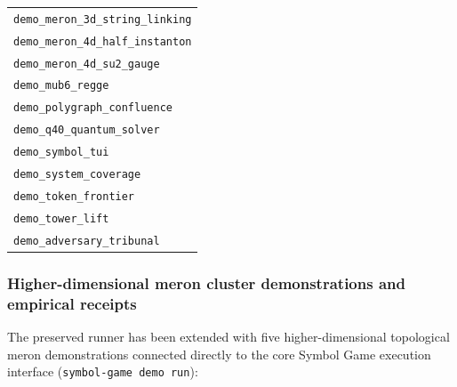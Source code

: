 \documentclass[
  11pt,
]{article}
\begin{document}
\begin{longtable}[]{@{}l@{}}
\texttt{demo\_\allowbreak{}meron\_\allowbreak{}3d\_\allowbreak{}string\_\allowbreak{}linking} \\
\texttt{demo\_\allowbreak{}meron\_\allowbreak{}4d\_\allowbreak{}half\_\allowbreak{}instanton} \\
\texttt{demo\_\allowbreak{}meron\_\allowbreak{}4d\_\allowbreak{}su2\_\allowbreak{}gauge} \\
\texttt{demo\_\allowbreak{}mub6\_\allowbreak{}regge} \\
\texttt{demo\_\allowbreak{}polygraph\_\allowbreak{}confluence} \\
\texttt{demo\_\allowbreak{}q40\_\allowbreak{}quantum\_\allowbreak{}solver} \\
\texttt{demo\_\allowbreak{}symbol\_\allowbreak{}tui} \\
\texttt{demo\_\allowbreak{}system\_\allowbreak{}coverage} \\
\texttt{demo\_\allowbreak{}token\_\allowbreak{}frontier} \\
\texttt{demo\_\allowbreak{}tower\_\allowbreak{}lift} \\
\texttt{demo\_\allowbreak{}adversary\_\allowbreak{}tribunal} \\
\end{longtable}

\subsubsection{Higher-dimensional meron cluster demonstrations and
empirical
receipts}\label{higher-dimensional-meron-cluster-demonstrations-and-empirical-receipts}

The preserved runner has been extended with five higher-dimensional
topological meron demonstrations connected directly to the core Symbol
Game execution interface (\texttt{symbol-\allowbreak{}game demo run}):
\end{document}
